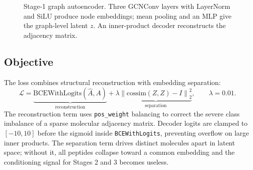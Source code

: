 \documentclass[11pt,a4paper]{article}
\begin{document}
\begin{figure}[H]
\centering
{}
\caption{Stage-1 graph autoencoder. Three GCNConv layers with LayerNorm and
SiLU produce node embeddings; mean pooling and an MLP give the graph-level
latent $z$. An inner-product decoder reconstructs the adjacency matrix.}
\label{fig:stage1}
\end{figure}

\subsection{Objective}
The loss combines structural reconstruction with embedding separation:
\[
\mathcal{L}
= \underbrace{\mathrm{BCEWithLogits}\!\left(\hat{A},A\right)}_{\text{reconstruction}}
+ \lambda \underbrace{\left\| \mathrm{cossim}(Z,Z) - I \right\|_2^2}_{\text{separation}},
\qquad \lambda = 0.01 .
\]
The reconstruction term uses \texttt{pos\_weight} balancing to correct the
severe class imbalance of a sparse molecular adjacency matrix. Decoder logits
are clamped to $[-10,10]$ before the sigmoid inside
\texttt{BCEWithLogits}, preventing overflow on large inner products.
The separation term drives distinct molecules apart in latent space; without
it, all peptides collapse toward a common embedding and the conditioning
signal for Stages 2 and 3 becomes useless.
\end{document}
